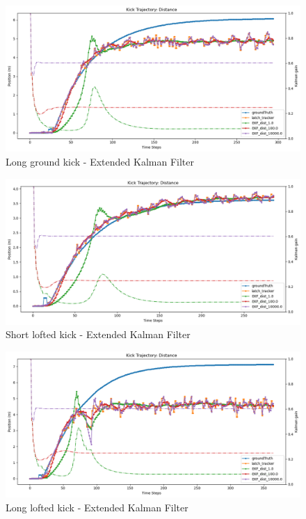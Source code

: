 \documentclass[a4paper,twoside,12pt]{report}
\begin{document}
\begin{figure}[h!]
\begin{center}
\includegraphics[width=12cm]{images/ekf_ground_long.png}
\caption{Long ground kick - Extended Kalman Filter}
\label{fig:ekfgroundlong}
\end{center}
\end{figure}

\begin{figure}[h!]
\begin{center}
\includegraphics[width=12cm]{images/ekf_loft_short.png}
\caption{Short lofted kick - Extended Kalman Filter}
\label{fig:ekfloftshort}
\end{center}
\end{figure}

\begin{figure}[h!]
\begin{center}
\includegraphics[width=12cm]{images/ekf_loft_long.png}
\caption{Long lofted kick - Extended Kalman Filter}
\label{fig:ekfloftlong}
\end{center}
\end{figure}
\end{document}
